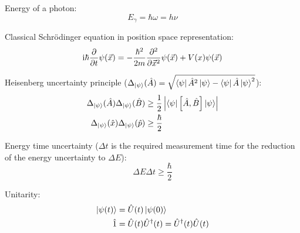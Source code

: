 		\noindent
		Energy of a photon:
		\begin{equation}
			E_\gamma = \hbar\omega = h\nu
		\end{equation}

		\noindent
		Classical Schrödinger equation in position space representation:
		\begin{equation}
			\mathrm{i}\hbar\frac{\partial }{\partial t}\psi(\vec{x}) = -\frac{\hbar^2}{2m}\frac{\partial^2}{\partial \vec{x}^2}\psi(\vec{x}) + V(x)\psi(\vec{x})
		\end{equation}

		\noindent
		Heisenberg uncertainty principle ($\Delta_{\Ket{\psi}} (\hat{A}) = \sqrt{\Bra{\psi}\hat{A}^2\Ket{\psi} - \Bra{\psi}\hat{A}\Ket{\psi}^2}$):
		\begin{equation}
			\begin{aligned}
				\Delta_{\Ket{\psi}}(\hat{A}) \Delta_{\Ket{\psi}}(\hat{B}) &\ge
				\frac{1}{2} \left|\Bra{\psi} \left[\hat{A},\hat{B}\right] \Ket{\psi}\right| \\
				\Delta_{\Ket{\psi}}(\hat{x}) \Delta_{\Ket{\psi}}(\hat{p}) &\ge
				\frac{\hbar}{2}
			\end{aligned}
		\end{equation}

		\noindent
		Energy time uncertainty ($\Delta t$ is the required measurement time for the reduction of the energy uncertainty to $\Delta E$):
		\begin{equation}
			\Delta E \Delta t \ge \frac{\hbar}{2}
		\end{equation}

		\noindent
		Unitarity:%
		\begin{equation}
			\begin{aligned}
				\Ket{\psi(t)} &= \hat{U}(t) \Ket{\psi(0)} \\
				\hat{1} &= \hat{U}(t)\hat{U}^\dagger(t) = \hat{U}^\dagger(t)\hat{U}(t) \\
			\end{aligned}
		\end{equation}

